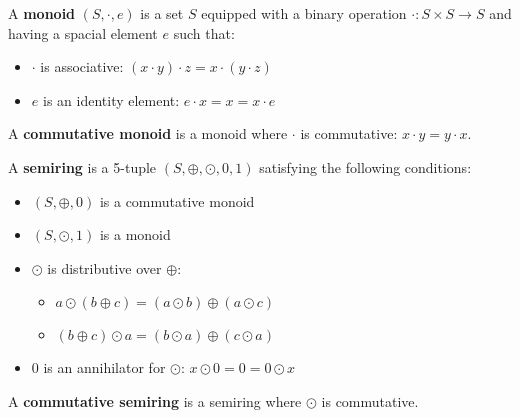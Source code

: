 
\begin{definition}[Monoid]
    A \textbf{monoid} $(S, \cdot, e)$ is a set $S$ equipped with a binary operation $\cdot : S \times S \rightarrow S$ and having a spacial element $e$ such that:
    \begin{itemize}
        \item {$\cdot$ is associative:} $ (x \cdot y) \cdot z = x \cdot (y \cdot z)$
        \item {$e$ is an identity element:} $  e \cdot x = x = x \cdot e$
    \end{itemize}
    A \textbf{commutative monoid} is a monoid where $\cdot$ is commutative: $x \cdot y = y \cdot x$.
\end{definition}

\begin{definition}[Semiring]
    \label{def_semiring}
        A \textbf{semiring} is a 5-tuple $(S,\oplus,\odot,0,1)$ satisfying the following conditions:
         \begin{itemize}
            \item {$(S,\oplus,0)$ is a commutative monoid} 
            \item {$(S,\odot,1)$ is a monoid} 
            \item {$\odot$ is distributive over $\oplus$:}
            \begin{itemize}
                \item $a \odot ( b \oplus c) = (a \odot b) \oplus (a \odot c)$ 
                \item $(b \oplus c) \odot a = (b \odot a) \oplus (c \odot a)$
            \end{itemize} 
            \item {0 is an annihilator for $\odot$:} $x \odot 0= 0 =  0 \odot x $
        \end{itemize}
        A \textbf{commutative semiring} is a semiring where $\odot$ is commutative.
\end{definition}

